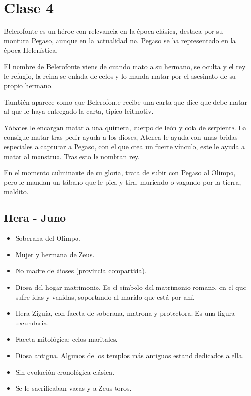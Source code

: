 \chapter{Clase 4}\label{ch:clase4}
Belerofonte es un héroe con relevancia en la época clásica, destaca por su montura Pegaso, aunque en la actualidad no. Pegaso se ha representado en la época Helenística.

El nombre de Belerofonte viene de cuando mato a su hermano, se oculta y el rey le refugio, la reina se enfada de celos y lo manda matar por el asesinato de su propio hermano.

También aparece como que Belerofonte recibe una carta que dice que debe matar al que le haya entregado la carta, típico leitmotiv.

Yóbates le encargan matar a una quimera, cuerpo de león y cola de serpiente. La consigue matar tras pedir ayuda a los dioses, Atenea le ayuda con unas bridas especiales a capturar a Pegaso, con el que crea un fuerte vínculo, este le ayuda a matar al monstruo. Tras esto le nombran rey.

En el momento culminante de su gloria, trata de subir con Pegaso al Olimpo, pero le mandan un tábano que le pica y tira, muriendo o vagando por la tierra, maldito.

\section{Hera - Juno}
\begin{itemize}
	\item Soberana del Olimpo.
	\item Mujer y hermana de Zeus.
	\item No madre de dioses (provincia compartida).
	\item Diosa del hogar matrimonio. Es el símbolo del matrimonio romano, en el que sufre idas y venidas, soportando al marido que está por ahí.
	\item Hera Ziguía, con faceta de soberana, matrona y protectora. Es una figura secundaria.
	\item Faceta mitológica: celos maritales.
	\item Diosa antigua. Algunos de los templos más antiguos estand dedicados a ella.
	\item Sin evolución cronológica clásica.
	\item Se le sacrificaban vacas y a Zeus toros.
\end{itemize}
\pagebreak

